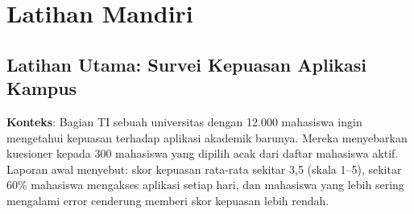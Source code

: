 \documentclass[
  indonesian,
  letterpaper,
]{book}
\newenvironment{Shaded}{\begin{snugshade}}{\end{snugshade}}
\newcommand{\AttributeTok}[1]{\textcolor[rgb]{0.40,0.45,0.13}{#1}}
\newcommand{\ConstantTok}[1]{\textcolor[rgb]{0.56,0.35,0.01}{#1}}
\newcommand{\DecValTok}[1]{\textcolor[rgb]{0.68,0.00,0.00}{#1}}
\newcommand{\FloatTok}[1]{\textcolor[rgb]{0.68,0.00,0.00}{#1}}
\newcommand{\FunctionTok}[1]{\textcolor[rgb]{0.28,0.35,0.67}{#1}}
\newcommand{\NormalTok}[1]{\textcolor[rgb]{0.00,0.23,0.31}{#1}}
\newcommand{\OtherTok}[1]{\textcolor[rgb]{0.00,0.23,0.31}{#1}}
\newcommand{\SpecialCharTok}[1]{\textcolor[rgb]{0.37,0.37,0.37}{#1}}
\newcommand{\StringTok}[1]{\textcolor[rgb]{0.13,0.47,0.30}{#1}}
\begin{document}
\section{Latihan Mandiri}\label{latihan-mandiri}

\subsection{Latihan Utama: Survei Kepuasan Aplikasi
Kampus}\label{latihan-utama-survei-kepuasan-aplikasi-kampus}

\textbf{Konteks}: Bagian TI sebuah universitas dengan 12.000 mahasiswa
ingin mengetahui kepuasan terhadap aplikasi akademik barunya. Mereka
menyebarkan kuesioner kepada 300 mahasiswa yang dipilih acak dari daftar
mahasiswa aktif. Laporan awal menyebut: skor kepuasan rata-rata sekitar
3,5 (skala 1--5), sekitar 60\% mahasiswa mengakses aplikasi setiap hari,
dan mahasiswa yang lebih sering mengalami error cenderung memberi skor
kepuasan lebih rendah.

\begin{Shaded}
\end{Shaded}
\end{document}
